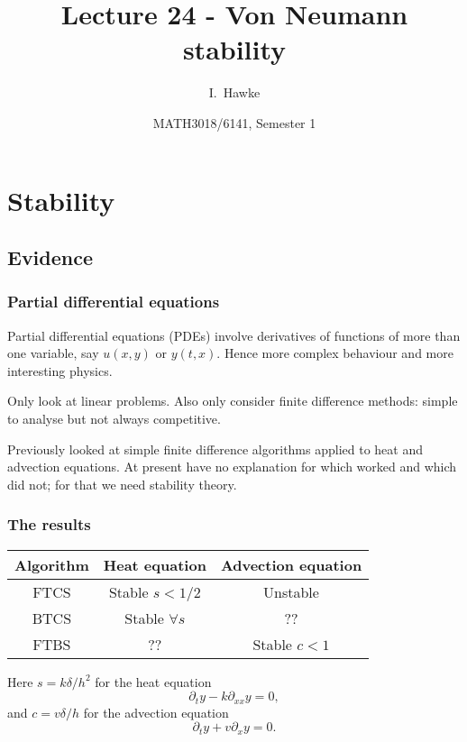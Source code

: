 \documentclass{beamer}
\title[Lecture 24] %
{Lecture 24 - Von Neumann stability}
\author[I. Hawke] %
{I.~Hawke}
\institute[University of Southampton] %
{
  School of Mathematics, \\
  University of Southampton, UK
}
\date[Semester 1] %
{MATH3018/6141, Semester 1}
\begin{document}
\begin{frame}
  \titlepage
\end{frame}

\section{Stability}

\subsection{Evidence}

\begin{frame}
  \frametitle{Partial differential equations}

  Partial differential equations (PDEs) involve derivatives of
  functions of more than one variable, say $u(x, y)$ or $y(t,
  x)$. Hence more complex behaviour and more interesting
  physics. \pause

  \vspace{1ex}

  Only look at linear problems.  Also only consider finite difference
  methods: simple to analyse but not always competitive. \pause

  \vspace{1ex}

  Previously looked at simple finite difference algorithms applied to
  heat and advection equations. At present have no explanation for
  which worked and which did not; for that we need stability theory.

\end{frame}

\begin{frame}
  \frametitle{The results}

  \begin{center}
    \begin{tabular}{c|c c}
      Algorithm & Heat equation & Advection equation \\ \hline
      FTCS & Stable $s < 1/2$ & Unstable \\
      BTCS & Stable $\forall s$ & ?? \\
      FTBS & ?? & Stable $c < 1$
    \end{tabular}
  \end{center}

  Here $s = k \delta / h^2$ for the heat equation
  \begin{equation*}
    \partial_t y - k \partial_{x x} y = 0,
  \end{equation*}
  and $c = v \delta / h$ for the advection equation
  \begin{equation*}
    \partial_t y + v \partial_x y = 0.
  \end{equation*}

\end{frame}
\end{document}
